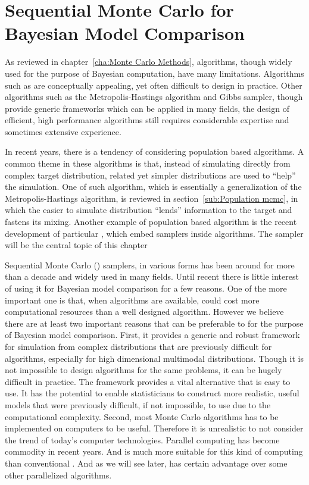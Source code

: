 \chapter{Sequential Monte Carlo for Bayesian Model Comparison}
\label{cha:Sequential Monte Carlo for Bayesian Model Comparison}

As reviewed in chapter~\ref{cha:Monte Carlo Methods}, \mcmc algorithms, though
widely used for the purpose of Bayesian computation, have many limitations.
Algorithms such as \rjmcmc are conceptually appealing, yet often difficult to
design in practice. Other algorithms such as the Metropolis-Hastings algorithm
and Gibbs sampler, though provide generic frameworks which can be applied in
many fields, the design of efficient, high performance algorithms still
requires considerable expertise and sometimes extensive experience.

In recent years, there is a tendency of considering population based
algorithms. A common theme in these algorithms is that, instead of simulating
directly from complex target distribution, related yet simpler distributions
are used to ``help'' the simulation. One of such algorithm, which is
essentially a generalization of the Metropolis-Hastings algorithm, \pmcmc is
reviewed in section~\ref{sub:Population mcmc}, in which the easier to simulate
distribution ``lends'' information to the target and fastens its mixing.
Another example of population based algorithm is the recent development of
particular \mcmc \cite{Andrieu:2010gc}, which embed \smc samplers inside \mcmc
algorithms. The \smc sampler will be the central topic of this chapter

Sequential Monte Carlo (\smc) samplers, in various forms has been around for
more than a decade and widely used in many fields. Until recent there is
little interest of using it for Bayesian model comparison for a few reasons.
One of the more important one is that, when \mcmc algorithms are available,
\smc could cost more computational resources than a well designed \mcmc
algorithm. However we believe there are at least two important reasons that
\smc can be preferable to \mcmc for the purpose of Bayesian model comparison.
First, it provides a generic and robust framework for simulation from complex
distributions that are previously difficult for \mcmc algorithms, especially
for high dimensional multimodal distributions. Though it is not impossible to
design \mcmc algorithms for the same problems, it can be hugely difficult in
practice. The \smc framework provides a vital alternative that is easy to use.
It has the potential to enable statisticians to construct more realistic,
useful models that were previously difficult, if not impossible, to use due to
the computational complexity. Second, most Monte Carlo algorithms has to be
implemented on computers to be useful. Therefore it is unrealistic to not
consider the trend of today's computer technologies. Parallel computing has
become commodity in recent years. And \smc is much more suitable for this kind
of computing than conventional \mcmc. And as we will see later, \smc has
certain advantage over some other parallelized algorithms.

